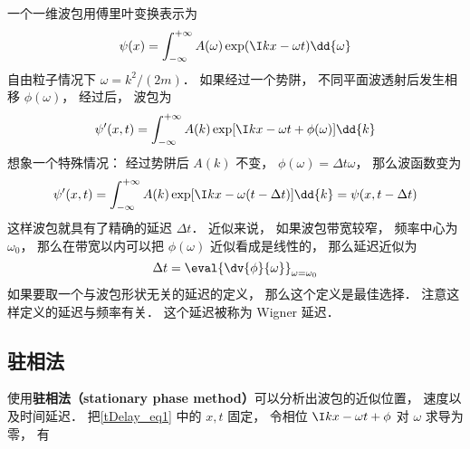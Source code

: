 
一个一维波包用傅里叶变换表示为
\begin{equation}
\psi(x) = \int_{-\infty}^{+\infty} A(\omega) \exp(\I kx - \omega t) \dd{\omega}
\end{equation}
自由粒子情况下 $\omega = k^2/(2m)$． 如果经过一个势阱， 不同平面波透射后发生相移 $\phi(\omega)$， 经过后， 波包为
\begin{equation}\label{tDelay_eq1}
\psi'(x, t) = \int_{-\infty}^{+\infty} A(k) \exp[\I kx - \omega t + \phi(\omega)] \dd{k}
\end{equation}
想象一个特殊情况： 经过势阱后 $A(k)$ 不变， $\phi(\omega) = \Delta t \omega$， 那么波函数变为
\begin{equation}
\psi'(x, t) = \int_{-\infty}^{+\infty} A(k) \exp[\I kx - \omega (t - \Delta t) ] \dd{k}
= \psi(x, t - \Delta t)
\end{equation}
这样波包就具有了精确的延迟 $\Delta t$． 近似来说， 如果波包带宽较窄， 频率中心为 $\omega_0$， 那么在带宽以内可以把 $\phi(\omega)$ 近似看成是线性的， 那么延迟近似为
\begin{equation}
\Delta t = \eval{\dv{\phi}{\omega}}_{\omega = \omega_0}
\end{equation}
如果要取一个与波包形状无关的延迟的定义， 那么这个定义是最佳选择． 注意这样定义的延迟与频率有关． 这个延迟被称为 Wigner 延迟．

\subsection{驻相法}
使用\textbf{驻相法（stationary phase method）}可以分析出波包的近似位置， 速度以及时间延迟． 把\autoref{tDelay_eq1} 中的 $x, t$ 固定， 令相位 $\I kx - \omega t + \phi$ 对 $\omega$ 求导为零， 有

